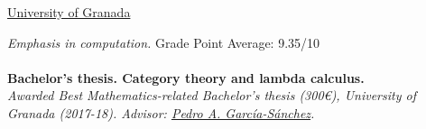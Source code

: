 \documentclass[nocolors]{friggeri-cv-a4}
\begin{document}
\begin{entrylist}
{\href{http://www.ugr.es/en/}{University of Granada}}
{\emph{Emphasis in computation.} Grade Point Average: 9.35/10 \\ \\
  { \textbf{Bachelor's thesis. Category theory and lambda calculus.} \\
    \emph{Awarded Best Mathematics-related Bachelor's thesis (300€), University of Granada (2017-18).
    Advisor: \href{https://scholar.google.es/citations?user=gvq9UmMAAAAJ&hl=en&oi=ao}{Pedro A. García-Sánchez}.}
  }
  
} 



\end{entrylist}
\end{document}
